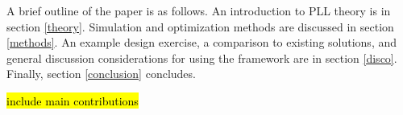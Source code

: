 A brief outline of the paper is as follows. An introduction to PLL theory is in section \ref{theory}. Simulation and optimization methods are discussed in section \ref{methods}. An example design exercise, a comparison to existing solutions, and general discussion considerations for using the framework are in section \ref{disco}. Finally, section \ref{conclusion} concludes.

\hl{include main contributions}